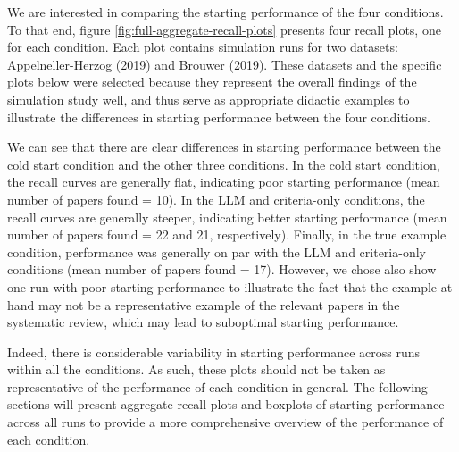 \documentclass[12pt]{article}
\begin{document}


We are interested in comparing the starting performance of the four conditions. To that end, figure \ref{fig:full-aggregate-recall-plots} presents four recall plots, one for each condition. Each plot contains simulation runs for two datasets: Appelneller-Herzog (2019) and Brouwer (2019). These datasets and the specific plots below were selected because they represent the overall findings of the simulation study well, and thus serve as appropriate didactic examples to illustrate the differences in starting performance between the four conditions. 

We can see that there are clear differences in starting performance between the cold start condition and the other three conditions. In the cold start condition, the recall curves are generally flat, indicating poor starting performance (mean number of papers found = 10). In the LLM and criteria-only conditions, the recall curves are generally steeper, indicating better starting performance (mean number of papers found = 22 and 21, respectively). Finally, in the true example condition, performance was generally on par with the LLM and criteria-only conditions (mean number of papers found = 17). However, we chose also show one run with poor starting performance to illustrate the fact that the example at hand may not be a representative example of the relevant papers in the systematic review, which may lead to suboptimal starting performance. 

Indeed, there is considerable variability in starting performance across runs within all the conditions. As such, these plots should not be taken as representative of the performance of each condition in general. The following sections will present aggregate recall plots and boxplots of starting performance across all runs to provide a more comprehensive overview of the performance of each condition.



\end{document}
